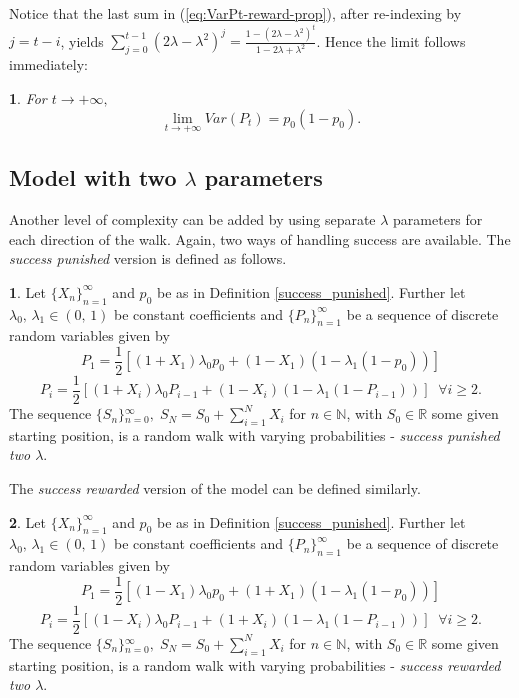 \documentclass{amsart}
\theoremstyle{definition}
\newtheorem{defn}{\protect\definitionname}
\theoremstyle{plain}
\theoremstyle{plain}
\newtheorem{cor}{\protect\corollaryname}
\numberwithin{equation}{section}
\providecommand{\corollaryname}{Corollary}
\providecommand{\definitionname}{Definition}
\begin{document}
Notice that the last sum in (\ref{eq:VarPt-reward-prop}), after re-indexing
by $j=t-i$, yields $\sum_{j=0}^{t-1}(2\lambda-\lambda^{2})^{j}=\frac{1-(2\lambda-\lambda^{2})^{t}}{1-2\lambda+\lambda^{2}}$.
Hence the limit follows immediately:

\begin{cor}
For $t\rightarrow+\infty,$ \textup{
\[
\lim_{t\to+\infty}Var(P_{t})=p_{0}(1-p_{0}).
\]
}
\end{cor}

\subsection{Model with two $\lambda$ parameters}

Another level of complexity can be added by using separate $\lambda$
parameters for each direction of the walk. Again, two ways of handling
success are available. The \emph{success punished} version is defined
as follows.

\begin{defn}
\label{2lambdas}Let ${\{X_{n}\}}_{n=1}^{\infty}$ and $p_{0}$ be
as in Definition \ref{success_punished}. Further let $\lambda_{0},\,\lambda_{1}\in(0,\,1)$
be constant coefficients and ${\{P_{n}\}}_{n=1}^{\infty}$ be a sequence
of discrete random variables given by
\begin{equation}
P_{1}=\frac{1}{2}[(1+X_{1})\lambda_{0}p_{0}+(1-X_{1})(1-\lambda_{1}(1-p_{0}))]\label{eq:P!1_def-1-1}
\end{equation}
\begin{equation}
P_{i}=\frac{1}{2}[(1+X_{i})\lambda_{0}P_{i-1}+(1-X_{i})(1-\lambda_{1}(1-P_{i-1}))]\;\;\forall i\geq2.\label{eq:Pi_def-1-1}
\end{equation}
The sequence ${\{S_{n}\}}{}_{n=0}^{\infty},\;S_{N}=S_{0}+\sum_{i=1}^{N}X_{i}$
for $n\in\mathbb{N}$, with $S_{0}\in\mathbb{R}$ some given starting
position, is a random walk with varying probabilities - \emph{success
punished two $\lambda$}.
\end{defn}

The \emph{success rewarded} version of the model can be defined similarly.

\begin{defn}
\label{2lambdas-reward}Let ${\{X_{n}\}}_{n=1}^{\infty}$ and $p_{0}$
be as in Definition \ref{success_punished}. Further let $\lambda_{0},\,\lambda_{1}\in(0,\,1)$
be constant coefficients and ${\{P_{n}\}}_{n=1}^{\infty}$ be a sequence
of discrete random variables given by
\[
P_{1}=\frac{1}{2}[(1-X_{1})\lambda_{0}p_{0}+(1+X_{1})(1-\lambda_{1}(1-p_{0}))]
\]
\[
P_{i}=\frac{1}{2}[(1-X_{i})\lambda_{0}P_{i-1}+(1+X_{i})(1-\lambda_{1}(1-P_{i-1}))]\;\;\forall i\geq2.
\]
The sequence ${\{S_{n}\}}{}_{n=0}^{\infty},\;S_{N}=S_{0}+\sum_{i=1}^{N}X_{i}$
for $n\in\mathbb{N}$, with $S_{0}\in\mathbb{R}$ some given starting
position, is a random walk with varying probabilities - \emph{success
rewarded two $\lambda$}.
\end{defn}
\end{document}
